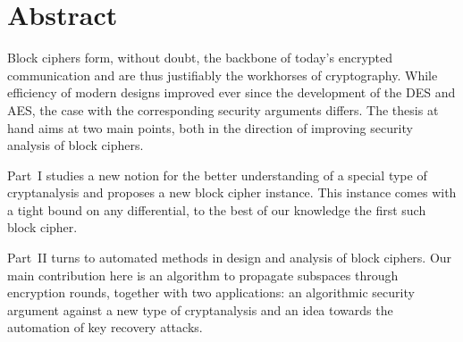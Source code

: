 \chapter*{Abstract}

Block ciphers form, without doubt, the backbone of today's encrypted communication and are thus justifiably the workhorses of cryptography.
While efficiency of modern designs improved ever since the development of the DES and AES, the case with the corresponding security arguments differs.
The thesis at hand aims at two main points, both in the direction of improving security analysis of block ciphers.

Part~I studies a new notion for the better understanding of a special type of cryptanalysis and proposes a new block cipher instance.
This instance comes with a tight bound on any differential, to the best of our knowledge the first such block cipher.

Part~II turns to automated methods in design and analysis of block ciphers.
Our main contribution here is an algorithm to propagate subspaces through encryption rounds, together with two applications: an algorithmic security argument against a new type of cryptanalysis and an idea towards the automation of key recovery attacks.
